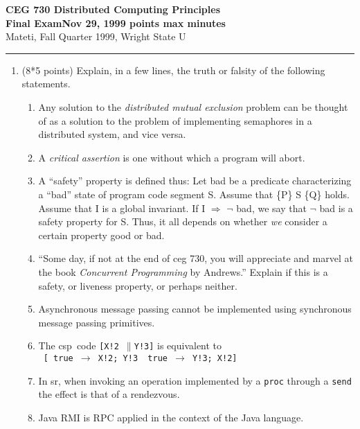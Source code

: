 \documentclass[12pt]{article}
\def\fat{\framebox[1mm]{\rule{0mm}{2mm}}}
\def\pr{$\parallel$}
\def\rar{$\rightarrow$}
\def\CSP{{\sc csp}}
\def\SR{{\sc sr}}
\begin{document}
{\bf CEG 
{\large \bf 730 Distributed Computing Principles}\\[5pt]
Final Exam\quad Nov 29, 1999 points max  minutes}\\
{Mateti,  Fall Quarter 1999, Wright State U}\\[-5pt]
\bigskip
\hrule

\begin{enumerate}

\item (8*5 points)
Explain, in a few lines, the truth or falsity of the following
statements.

\begin{enumerate}

\item
Any solution to the {\em distributed mutual exclusion} problem can be
thought of as a solution to the problem of implementing semaphores in
a distributed system, and vice versa.

\item
A {\em critical assertion} is one without which a program will abort.

\item A ``safety'' property is defined thus: Let {\sc bad} be a
{predicate} characterizing a ``bad'' {state} of program code segment
S.  Assume that {\{P\} S \{Q\}} holds.  Assume that I is a {global
invariant}.  If I $\Rightarrow$ $\neg$ {\sc bad}, we say that $\neg$
{\sc bad} is a safety property for S.  Thus, it all depends on whether
{\em we} consider a certain property good or bad.

\item
``Some day, if not at the end of {\sc ceg} 730, you will appreciate
and marvel at the book {\em Concurrent Programming} by Andrews.''
Explain if this is a safety, or liveness property, or perhaps neither.

\item
Asynchronous message passing cannot be implemented using synchronous
message passing primitives.

\item
The \CSP\ code {\tt [X!2 \pr Y!3]} is equivalent to \\
{\tt
[  true \rar\ X!2; Y!3 \fat\ true \rar\ Y!3; X!2]}

\item
In \SR, when invoking an operation implemented by a {\tt proc} through
a {\tt send} the effect is that of a rendezvous.

\item
Java RMI is RPC applied in the context of the Java language.


\end{enumerate}
\end{enumerate}
\end{document}
